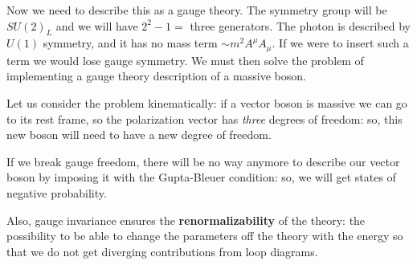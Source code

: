 \documentclass[main.tex]{subfiles}
\begin{document}
Now we need to describe this as a gauge theory. 
The symmetry group will be \(SU(2)_{L}\) and we will have \(2^2-1 = \) three generators.
The photon is described by \(U(1)\) symmetry, and it has no mass term \(\sim m^2 A^{\mu } A_{\mu }\). 
If we were to insert such a term we would lose gauge symmetry. 
We must then solve the problem of implementing a gauge theory description of a massive boson.

Let us consider the problem kinematically: if a vector boson is massive we can go to its rest frame, so the polarization vector has \emph{three} degrees of freedom: so, this new boson will need to have a new degree of freedom.

If we break gauge freedom, there will be no way anymore to describe our vector boson by imposing it with the Gupta-Bleuer condition: so, we will get states of negative probability. 

Also, gauge invariance ensures the \textbf{renormalizability} of the theory: the possibility to be able to change the parameters off the theory with the energy so that we do not get diverging contributions from loop diagrams. 




\end{document}
